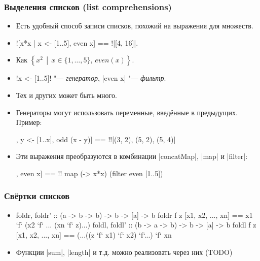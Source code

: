 \documentclass[11pt]{beamer}
\begin{document}
\begin{frame}[fragile]
  \frametitle{Выделения списков (list comprehensions)}
  \begin{itemize}
    \item Есть удобный способ записи списков, похожий на выражения для множеств.
    \item[] \haskinline![x*x | x <- [1..5], even x] == !\pause \haskinline|[4, 16]|.
    \item Как \(\left\{x^2\,\middle|\,x \in \{1, \ldots, 5\},\,even(x)\right\}\).
    \item \haskinline!x <- [1..5]! "--- \emph{генератор}, \haskinline|even x| "--- \emph{фильтр}.
          \pause
    \item Тех и других может быть много.
    \item Генераторы могут использовать переменные, введённые в предыдущих. Пример:
          \begin{haskell}
            [(x, y) | x <- [1..5], y <- [1..x], odd (x - y)] == !\pause![(3, 2), (5, 2), (5, 4)]
          \end{haskell}
    \item Эти выражения преобразуются в комбинации \haskinline|concatMap|, \haskinline|map| и \haskinline|filter|:
          \begin{haskell}
            [x*x | x <- [1..5], even x] == !\pause!
                map (\x -> x*x) (filter even [1..5])
          \end{haskell}
  \end{itemize}
\end{frame}

\begin{frame}[fragile]
  \frametitle{Свёртки списков}
  \begin{itemize}
    \item
          \begin{haskell}
            foldr, foldr' :: (a -> b -> b) -> b -> [a] -> b
            foldr f z [x1, x2, ..., xn] == 
              x1 `f` (x2 `f` ... (xn `f` z)...)
            foldl, foldl' :: (b -> a -> b) -> b -> [a] -> b
            foldl f z [x1, x2, ..., xn] == 
              (...((z `f` x1) `f` x2) `f`...) `f` xn
          \end{haskell}
    \item Функции \haskinline|sum|, \haskinline|length| и т.д. можно реализовать через них (TODO)  %
  \end{itemize}
\end{frame}
\end{document}
